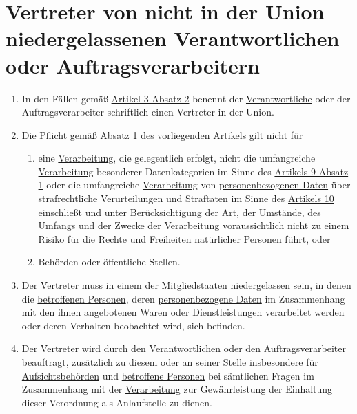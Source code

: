 \chapter{Vertreter von nicht in der Union niedergelassenen Verantwortlichen oder Auftragsverarbeitern}
\label{ch:27}


\begin{enumerate}

  \item In den Fällen gemäß \hyperref[itm:03-2]{Artikel 3 Absatz 2} benennt der \hyperref[itm:04-7]{Verantwortliche} oder der
   Auftragsverarbeiter schriftlich einen Vertreter in der Union.
  \label{itm:27-1}

  \item Die Pflicht gemäß \hyperref[itm:27-1]{Absatz 1 des vorliegenden Artikels} gilt nicht für
  \label{itm:27-2}

  \begin{enumerate}
  
    \item eine \hyperref[itm:04-2]{Verarbeitung}, die gelegentlich erfolgt, nicht die umfangreiche \hyperref[itm:04-2]{Verarbeitung} besonderer Datenkategorien im
     Sinne des \hyperref[itm:09-1]{Artikels 9 Absatz 1} oder die umfangreiche \hyperref[itm:04-2]{Verarbeitung} von \hyperref[itm:04-1]{personenbezogenen Daten}
     über strafrechtliche Verurteilungen und Straftaten im Sinne des \hyperref[ch:10]{Artikels 10} einschließt und
     unter Berücksichtigung der Art, der Umstände, des Umfangs und der Zwecke der \hyperref[itm:04-2]{Verarbeitung} voraussichtlich nicht zu
     einem Risiko für die Rechte und Freiheiten natürlicher Personen führt, oder
    \label{itm:27-2a}

    \item Behörden oder öffentliche Stellen.
    \label{itm:27-2b}

  \end{enumerate}

  \item Der Vertreter muss in einem der Mitgliedstaaten niedergelassen sein, in denen die \hyperref[itm:04-1]{betroffenen Personen}, deren
   \hyperref[itm:04-1]{personenbezogene Daten} im Zusammenhang mit den ihnen angebotenen Waren oder Dienstleistungen verarbeitet werden oder
   deren Verhalten beobachtet wird, sich befinden.
  \label{itm:27-3}

  \item Der Vertreter wird durch den \hyperref[itm:04-7]{Verantwortlichen} oder den Auftragsverarbeiter beauftragt, zusätzlich zu diesem oder
   an seiner Stelle insbesondere für \hyperref[itm:04-21]{Aufsichtsbehörden} und \hyperref[itm:04-1]{betroffene Personen} bei sämtlichen Fragen im Zusammenhang
   mit der \hyperref[itm:04-2]{Verarbeitung} zur Gewährleistung der Einhaltung dieser Verordnung als Anlaufstelle zu dienen.
  \label{itm:27-4}


\end{enumerate}
